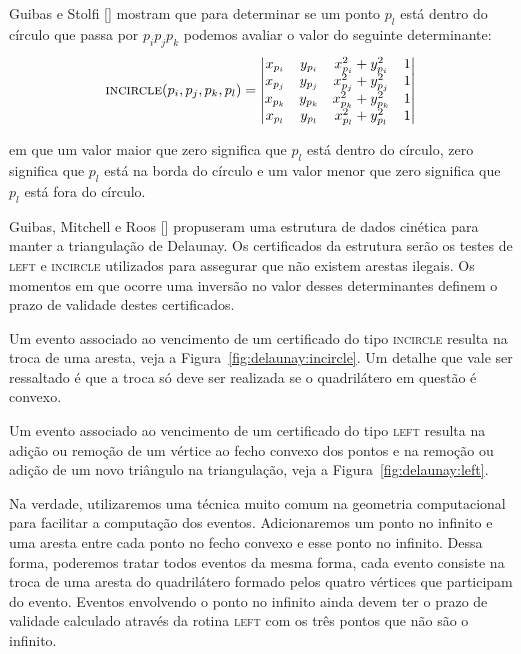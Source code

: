 Guibas e Stolfi [\cite{guibas-stolfi}] mostram que para determinar se um ponto $p_l$ está dentro
do círculo que passa por $p_{i}p_{j}p_{k}$ podemos avaliar o valor do seguinte determinante:
$$\textsc{incircle}(p_i, p_j, p_k, p_l) =
\begin{vmatrix}
    x_{p_i} & y_{p_i} & x_{p_i}^2 + y_{p_i}^2 & 1 \\
    x_{p_j} & y_{p_j} & x_{p_j}^2 + y_{p_j}^2 & 1 \\
    x_{p_k} & y_{p_k} & x_{p_k}^2 + y_{p_k}^2 & 1 \\
    x_{p_l} & y_{p_l} & x_{p_l}^2 + y_{p_l}^2 & 1
\end{vmatrix}$$

em que um valor maior que zero significa que $p_l$ está dentro do círculo, zero significa que $p_l$
está na borda do círculo e um valor menor que zero significa que $p_l$ está fora do círculo.

Guibas, Mitchell e Roos [\cite{guibas-mitchell-roos}] propuseram uma estrutura de dados cinética
para manter a triangulação de Delaunay.
Os certificados da estrutura serão os testes de \textsc{left} e \textsc{incircle} utilizados para
assegurar que não existem arestas ilegais.
Os momentos em que ocorre uma inversão no valor desses determinantes definem o prazo de validade
destes certificados.

Um evento associado ao vencimento de um certificado do tipo \textsc{incircle} resulta na troca de
uma aresta, veja a Figura~\ref{fig:delaunay:incircle}.
Um detalhe que vale ser ressaltado é que a troca só deve ser realizada se o quadrilátero em
questão é convexo.



Um evento associado ao vencimento de um certificado do tipo \textsc{left} resulta na adição ou
remoção de um vértice ao fecho convexo dos pontos e na remoção ou adição de um novo triângulo na
triangulação, veja a Figura~\ref{fig:delaunay:left}.



Na verdade, utilizaremos uma técnica muito comum na geometria computacional para facilitar a
computação dos eventos.
Adicionaremos um ponto no infinito e uma aresta entre cada ponto no fecho convexo e esse ponto no
infinito.
Dessa forma, poderemos tratar todos eventos da mesma forma, cada evento consiste na troca de uma
aresta do quadrilátero formado pelos quatro vértices que participam do evento.
Eventos envolvendo o ponto no infinito ainda devem ter o prazo de validade
calculado através da rotina \textsc{left} com os três pontos que não são o infinito.

